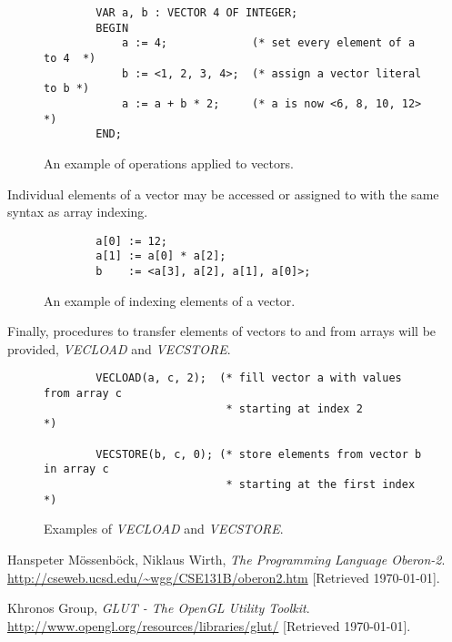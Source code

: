 \documentclass[a4paper,11pt]{article}
\begin{document}
    \begin{figure}[h]
    \begin{lstlisting}
        VAR a, b : VECTOR 4 OF INTEGER;
        BEGIN
            a := 4;             (* set every element of a to 4  *)
            b := <1, 2, 3, 4>;  (* assign a vector literal to b *)
            a := a + b * 2;     (* a is now <6, 8, 10, 12>      *)
        END;
    \end{lstlisting}
    \caption{An example of operations applied to vectors.}
    \end{figure}

    \noindent
    Individual elements of a vector may be accessed or assigned to with the same syntax as array indexing.

    \begin{figure}[!htbp]
    \begin{lstlisting}
        a[0] := 12;
        a[1] := a[0] * a[2];
        b    := <a[3], a[2], a[1], a[0]>;
    \end{lstlisting}
    \caption{An example of indexing elements of a vector.}
    \end{figure}

    \noindent
    Finally, procedures to transfer elements of vectors to and from arrays will be provided, \emph{VECLOAD} and \emph{VECSTORE}.

    \begin{figure}[!htbp]
    \begin{lstlisting}
        VECLOAD(a, c, 2);  (* fill vector a with values from array c
                            * starting at index 2                     *)

        VECSTORE(b, c, 0); (* store elements from vector b in array c
                            * starting at the first index             *)
    \end{lstlisting}
    \caption{Examples of \emph{VECLOAD} and \emph{VECSTORE}.}
    \end{figure}

    \newpage
    \begin{thebibliography}{9}
            Hanspeter M\"{o}ssenb\"{o}ck, Niklaus Wirth,
            \emph{The Programming Language Oberon-2}. \newline
            \url{http://cseweb.ucsd.edu/~wgg/CSE131B/oberon2.htm}
            [Retrieved \today].

            Khronos Group,
            \emph{GLUT - The OpenGL Utility Toolkit}. \newline
            \url{http://www.opengl.org/resources/libraries/glut/}
            [Retrieved \today].

    \end{thebibliography}
\end{document}
